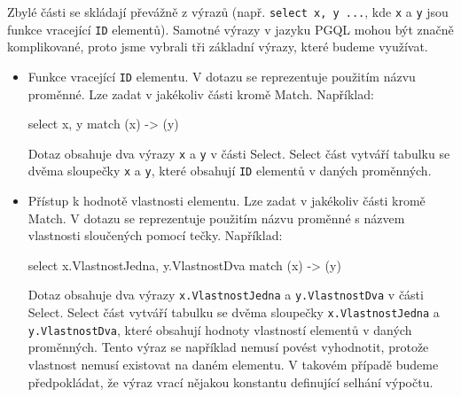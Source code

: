 Zbylé části se skládají převážně z výrazů (např. \texttt{select x, y ...}, kde \texttt{x} a \texttt{y} jsou funkce vracející \texttt{ID} elementů).
Samotné výrazy v jazyku PGQL mohou být značně komplikované, proto jsme vybrali tři základní výrazy, které budeme využívat.
\begin{itemize}

\item Funkce vracející \texttt{ID} elementu. 
V dotazu se reprezentuje použitím názvu proměnné.
Lze zadat v jakékoliv části kromě Match.
Například:
\begin{code}
select x, y match (x) -> (y)
\end{code}
Dotaz obsahuje dva výrazy \texttt{x} a \texttt{y} v části Select.
Select část vytváří tabulku se dvěma sloupečky \texttt{x} a \texttt{y}, které obsahují \texttt{ID} elementů v daných proměnných.

\item 
Přístup k hodnotě vlastnosti elementu.
Lze zadat v jakékoliv části kromě Match.
V dotazu se reprezentuje použitím názvu proměnné s názvem vlastnosti sloučených pomocí tečky.
Například: 
\begin{code}
select x.VlastnostJedna, y.VlastnostDva match (x) -> (y)
\end{code}
Dotaz obsahuje dva výrazy \texttt{x.VlastnostJedna} a \texttt{y.VlastnostDva} v části Select.
Select část vytváří tabulku se dvěma sloupečky \texttt{x.VlastnostJedna} a \texttt{y.VlastnostDva}, které obsahují hodnoty vlastností elementů v daných proměnných.
Tento výraz se například nemusí povést vyhodnotit, protože vlastnost nemusí existovat na daném elementu.
V takovém případě budeme předpokládat, že výraz vrací nějakou konstantu definující selhání výpočtu.


\end{itemize}
